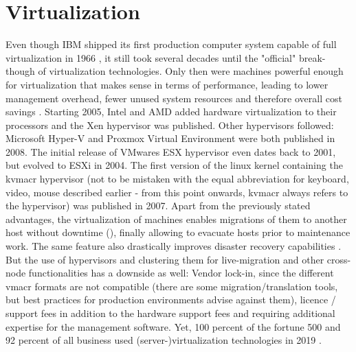 \section{Virtualization}
Even though IBM shipped its first production computer system capable of full virtualization in 1966 \cite{ibm_first_hypervisor}, it still took several decades until the "official" break-though of virtualization technologies. Only then were machines powerful enough for virtualization that makes sense in terms of performance, leading to lower management overhead, fewer unused system resources and therefore overall cost savings \cite{xen_killer}.
Starting 2005, Intel and AMD added hardware virtualization to their processors and the Xen hypervisor was published. Other hypervisors followed: Microsoft Hyper-V and Proxmox Virtual Environment were both published in 2008. The initial release of VMwares ESX hypervisor even dates back to 2001, but evolved to ESXi in 2004. The first version of the linux kernel containing the \gls{kvmacr} hypervisor (not to be mistaken with the equal abbreviation for keyboard, video, mouse described earlier - from this point onwards, \gls{kvmacr} always refers to the hypervisor) was published in 2007.
\newline
Apart from the previously stated advantages, the virtualization of machines enables migrations of them to another host without downtime (), finally allowing to evacuate hosts prior to maintenance work. The same feature also drastically improves disaster recovery capabilities \cite{definition_server_virtualization}.
\newline
But the use of hypervisors and clustering them for live-migration and other cross-node functionalities has a downside as well: Vendor lock-in, since the different \gls{vmacr} formats are not compatible (there are some migration/translation tools, but best practices for production environments advise against them), licence / support fees in addition to the hardware support fees and requiring additional expertise for the management software.
\newline
Yet, 100 percent of the fortune 500 and 92 percent of all business used (server-)virtualization technologies in 2019 \cite{adoption_of_virtualization_technologies} \cite{vmware_accelerate_it} \cite{spiceworks_state_of_virtualization}.



